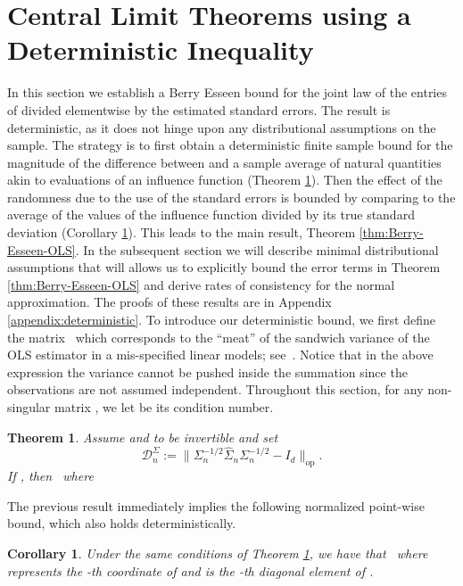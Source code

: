\documentclass{article}
\newtheorem{theorem}{Theorem}
\newtheorem{corollary}{Corollary}
\begin{document}
\section{Central Limit Theorems using a Deterministic Inequality}
\label{section::determiniswtic}
In this section
we establish a Berry Esseen bound
for the joint law
of the entries of   divided elementwise by the estimated
standard errors.
The result is deterministic, as it does not hinge upon any distributional
assumptions on the sample.
The strategy is to first obtain a deterministic finite sample bound
for the magnitude of the difference between  
and a sample average of natural quantities akin to evaluations of an influence function
(Theorem \ref{thm:Basic-deter-ineq}).
Then the effect of the randomness
due to the use of the standard errors
is bounded
by comparing to the average of the values of the influence function
divided by its true standard deviation
(Corollary \ref{cor:Max-Statistic-Correct-Scaling}).
This leads to the main result,
Theorem \ref{thm:Berry-Esseen-OLS}.
In the subsequent section we will describe minimal distributional assumptions
that will allows us to explicitly bound
the error terms in
Theorem \ref{thm:Berry-Esseen-OLS} and derive rates of consistency for the normal approximation.
The proofs of these results are in Appendix \ref{appendix:deterministic}.
To introduce our deterministic bound, we first define the matrix
\ which corresponds to the ``meat'' of the sandwich variance of the OLS estimator in a mis-specified linear models; see~\cite{Buja14}.
Notice that in the above expression the variance cannot be pushed inside the summation since the observations are not assumed independent. Throughout this section, for any non-singular matrix  , we let   be its condition number.
\begin{theorem}\label{thm:Basic-deter-ineq}
Assume   and   to be invertible and set
\begin{equation}\label{eq:Dn}
\mathcal{D}_n^{\Sigma} := \|\Sigma_n^{-1/2}\widehat{\Sigma}_n\Sigma_n^{-1/2} - I_d\|_{\mathrm{op}}.
\end{equation}
If  , then
\ where
\ \end{theorem}
The previous
result immediately implies the following normalized point-wise bound, which also holds deterministically.
\begin{corollary}\label{cor:Max-Statistic-Correct-Scaling}
Under the same conditions of Theorem \ref{thm:Basic-deter-ineq}, we have that
\ where   represents the  -th coordinate of   and   is the  -th diagonal element of  .
\end{corollary}
\end{document}
